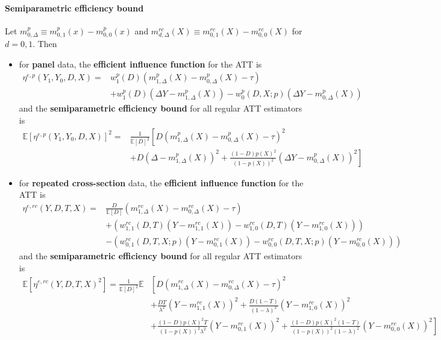 \documentclass[twoside]{article}
\begin{document}
\paragraph*{Semiparametric efficiency bound} 
Let $m^p_{0,\Delta} \equiv m^p_{0,1}(x)-m^p_{0,0}(x)$ and $m^{rc}_{d,\Delta}(X)\equiv m^{rc}_{0,1}(X)-m^{rc}_{0,0}(X)$ for $d=0,1$. Then 
\begin{itemize}
    \item for \textbf{panel} data, the \textbf{efficient influence function} for the ATT is
    \begin{align*}
        \eta^{e,p}\left(Y_1,Y_0,D,X\right) =& w^p_1(D)\left(m^p_{1,\Delta}(X) - m^p_{0,\Delta}(X) -\tau \right) \\
        &+ w_1^p(D)\left(\Delta Y-m^p_{1,\Delta}(X)\right) - w^p_0(D,X;p)\left(\Delta Y-m^p_{0,\Delta}(X)\right)
    \end{align*}
    and the \textbf{semiparametric efficiency bound} for all regular ATT estimators is
    \begin{align*}
        \mathbb{E}\left[\eta^{e,p}\left(Y_1,Y_0,D,X\right)\right]^2 =& \frac{1}{\mathbb{E}\left[D\right]^2} \left[ D\left(m^p_{1,\Delta}(X)-m^p_{0,\Delta}(X)-\tau\right)^2 \right. \\
        & \left. + D\left(\Delta-m^p_{1,\Delta}(X)\right)^2 + \frac{(1-D)p(X)^2}{\left(1-p(X)\right)^2} \left(\Delta Y-m^p_{0,\Delta}(X)\right)^2 \right]
    \end{align*}
    \item for \textbf{repeated cross-section} data, the \textbf{efficient influence function} for the ATT is
    \begin{align*}
        \eta^{e,rc}\left(Y,D,T,X\right) =& \frac{D}{\mathbb{E}[D]}\left(m^{rc}_{1,\Delta}(X)-m^{rc}_{0,\Delta}(X)-\tau\right) \\
        &+\left( w^{rc}_{1,1}(D,T)\left(Y-m^{rc}_{1,1}(X)\right)-w^{rc}_{1,0}(D,T)\left(Y-m^{rc}_{1,0}(X)\right) \right)\\
        &- \left(w^{rc}_{0,1}(D,T,X;p)\left(Y-m^{rc}_{0,1}(X)\right) - w^{rc}_{0,0}(D,T,X;p)\left(Y-m^{rc}_{0,0}(X)\right) \right)
    \end{align*}
    and the \textbf{semiparametric efficiency bound} for all regular ATT estimators is
    \begin{align*}
        \mathbb{E}\left[\eta^{e,rc}\left(Y,D,T,X\right)^2\right] = \frac{1}{\mathbb{E}[D]^2} \mathbb{E}& \left[ D \left(m^{rc}_{1,\Delta}(X)-m^{rc}_{0,\Delta}(X)-\tau\right)^2 \right. \\
        & + \frac{DT}{\lambda^2}\left(Y-m^{rc}_{1,1}(X)\right)^2 + \frac{D(1-T)}{(1-\lambda)^2}\left(Y-m^{rc}_{1,0}(X)\right)^2 \\
        &+ \left. \frac{(1-D)p(X)^2T}{\left(1-p(X)\right)^2\lambda^2}\left(Y-m^{rc}_{0,1}(X)\right)^2 + \frac{(1-D)p(X)^2 (1-T)}{\left(1-p(X)\right)^2(1-\lambda)^2}\left(Y-m^{rc}_{0,0}(X)\right)^2 \right]
    \end{align*}
\end{itemize}
\end{document}
